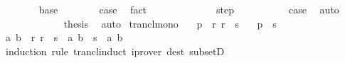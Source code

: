 \begin{isabellebody}
\ \ \ \ \ \ \isamarkupfalse%
\ base\isanewline
\ \ \ \ \ \ \isamarkupfalse%
\ {\isacharquery}{\kern0pt}case\ \isamarkupfalse%
\ {\isacharparenleft}{\kern0pt}fact\ {}{\isacharparenright}{\kern0pt}\isanewline
\ \ \ \ \isamarkupfalse%
\isanewline
\ \ \ \ \ \ \isamarkupfalse%
\ step\isanewline
\ \ \ \ \ \ \isamarkupfalse%
\ {\isacharasterisk}{\kern0pt}{\isacharasterisk}{\kern0pt}\ \isamarkupfalse%
\ {\isacharquery}{\kern0pt}case\ \isamarkupfalse%
\ auto\isanewline
\ \ \ \ \isamarkupfalse%
\isanewline
\ \ \isamarkupfalse%
\isanewline
\ \ \isamarkupfalse%
\ \isamarkupfalse%
\ {\isacharquery}{\kern0pt}thesis\ \isamarkupfalse%
\ auto\isanewline
{}\isamarkupfalse%
%
\endisatagproof
{\isafoldproof}%
%
\isadelimproof
%
\endisadelimproof
%
\isadelimdocument
%
\endisadelimdocument
%
\isatagdocument
%
\isamarkuptrue%
%
\endisatagdocument
{\isafolddocument}%
%
\isadelimdocument
%
\endisadelimdocument
{}\isamarkupfalse%
\ trancl{\isacharunderscore}{\kern0pt}mono{\isacharcolon}{\kern0pt}\isanewline
\ \ \ {\isachardoublequoteopen}p\ {\isasymin}\ r\isactrlsup {\isacharplus}{\kern0pt}{\isachardoublequoteclose}\ {\isachardoublequoteopen}r\ {\isasymsubseteq}\ s{\isachardoublequoteclose}\isanewline
\ \ \ {\isachardoublequoteopen}p\ {\isasymin}\ s\isactrlsup {\isacharplus}{\kern0pt}{\isachardoublequoteclose}\isanewline
%
\isadelimproof
%
\endisadelimproof
%
\isatagproof
{}\isamarkupfalse%
\ {\isacharminus}{\kern0pt}\isanewline
\ \ \isamarkupfalse%
\ {\isachardoublequoteopen}{\isasymlbrakk}{\isacharparenleft}{\kern0pt}a{\isacharcomma}{\kern0pt}\ b{\isacharparenright}{\kern0pt}\ {\isasymin}\ r\isactrlsup {\isacharplus}{\kern0pt}{\isacharsemicolon}{\kern0pt}\ r\ {\isasymsubseteq}\ s{\isasymrbrakk}\ {\isasymLongrightarrow}\ {\isacharparenleft}{\kern0pt}a{\isacharcomma}{\kern0pt}\ b{\isacharparenright}{\kern0pt}\ {\isasymin}\ s\isactrlsup {\isacharplus}{\kern0pt}{\isachardoublequoteclose}\ \ a\ b\isanewline
\ \ \ \ \isamarkupfalse%
\ {\isacharparenleft}{\kern0pt}induction\ rule{\isacharcolon}{\kern0pt}\ trancl{\isachardot}{\kern0pt}induct{\isacharparenright}{\kern0pt}\ {\isacharparenleft}{\kern0pt}iprover\ dest{\isacharcolon}{\kern0pt}\ subsetD{\isacharparenright}{\kern0pt}{\isacharplus}{\kern0pt}\isanewline

\end{isabellebody}
